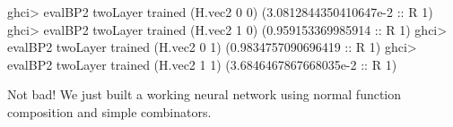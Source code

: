 \documentclass[]{article}
\newenvironment{Shaded}{}{}
\newcommand{\DataTypeTok}[1]{\textcolor[rgb]{0.56,0.13,0.00}{#1}}
\newcommand{\DecValTok}[1]{\textcolor[rgb]{0.25,0.63,0.44}{#1}}
\newcommand{\FloatTok}[1]{\textcolor[rgb]{0.25,0.63,0.44}{#1}}
\newcommand{\FunctionTok}[1]{\textcolor[rgb]{0.02,0.16,0.49}{#1}}
\newcommand{\NormalTok}[1]{#1}
\newcommand{\OtherTok}[1]{\textcolor[rgb]{0.00,0.44,0.13}{#1}}
\begin{document}
\begin{Shaded}
\begin{Highlighting}[]
\NormalTok{ghci}\FunctionTok{>}\NormalTok{ evalBP2 twoLayer trained (H.vec2 }\DecValTok{0} \DecValTok{0}\NormalTok{)}
\NormalTok{(}\FloatTok{3.0812844350410647e-2}\OtherTok{ ::} \DataTypeTok{R} \DecValTok{1}\NormalTok{)}
\NormalTok{ghci}\FunctionTok{>}\NormalTok{ evalBP2 twoLayer trained (H.vec2 }\DecValTok{1} \DecValTok{0}\NormalTok{)}
\NormalTok{(}\FloatTok{0.959153369985914}\OtherTok{ ::} \DataTypeTok{R} \DecValTok{1}\NormalTok{)}
\NormalTok{ghci}\FunctionTok{>}\NormalTok{ evalBP2 twoLayer trained (H.vec2 }\DecValTok{0} \DecValTok{1}\NormalTok{)}
\NormalTok{(}\FloatTok{0.9834757090696419}\OtherTok{ ::} \DataTypeTok{R} \DecValTok{1}\NormalTok{)}
\NormalTok{ghci}\FunctionTok{>}\NormalTok{ evalBP2 twoLayer trained (H.vec2 }\DecValTok{1} \DecValTok{1}\NormalTok{)}
\NormalTok{(}\FloatTok{3.6846467867668035e-2}\OtherTok{ ::} \DataTypeTok{R} \DecValTok{1}\NormalTok{)}
\end{Highlighting}
\end{Shaded}

Not bad! We just built a working neural network using normal function
composition and simple combinators.
\end{document}
